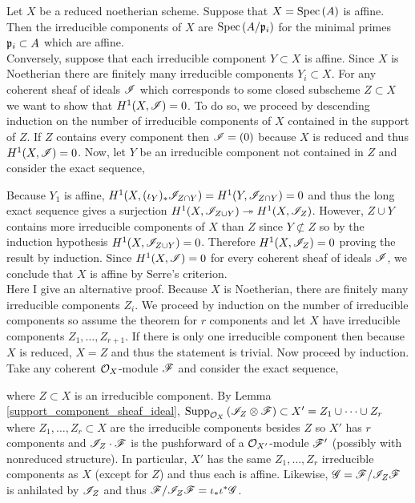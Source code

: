 \documentclass[12pt]{article}
\begin{document}
Let $X$ be a reduced noetherian scheme. Suppose that $X = \mathrm{Spec}\left( A \right)$ is affine. Then the irreducible components of $X$ are $\mathrm{Spec}\left( A/\mathfrak{p}_i \right)$ for the minimal primes $\mathfrak{p}_i \subset A$ which are affine. 
\bigskip\\
Conversely, suppose that each irreducible component $Y \subset X$ is affine. Since $X$ is Noetherian there are finitely many irreducible components $Y_i \subset X$. For any coherent sheaf of ideals $\mathscr{I}$ which corresponds to some closed subscheme $Z \subset X$ we want to show that $H^1(X, \mathscr{I}) = 0$. To do so, we proceed by descending induction on the number of irreducible components of $X$ contained in the support of $Z$. If $Z$ contains every component then $\mathscr{I} = (0)$ because $X$ is reduced and thus $H^1(X, \mathscr{I}) = 0$. Now, let $Y$ be an irreducible component not contained in $Z$ and consider the exact sequence,
\begin{center}
\end{center}
Because $Y_1$ is affine, $H^1(X, (\iota_{Y})_* \mathscr{I}_{Z \cap Y}) = H^1(Y, \mathscr{I}_{Z \cap Y}) = 0$ and thus the long exact sequence gives a surjection $H^1(X, \mathscr{I}_{Z \cup Y}) \twoheadrightarrow H^1(X, \mathscr{I}_Z)$. However, $Z \cup Y$ contains more irreducible components of $X$ than $Z$ since $Y \not\subset Z$ so by the induction hypothesis $H^1(X, \mathscr{I}_{Z \cup Y}) = 0$. Therefore $H^1(X, \mathscr{I}_Z) = 0$ proving the result by induction. Since $H^1(X, \mathscr{I}) = 0$ for every coherent sheaf of ideals $\mathscr{I}$, we conclude that $X$ is affine by Serre's criterion. 
\bigskip\\
Here I give an alternative proof. Because $X$ is Noetherian, there are finitely many irreducible components $Z_i$. We proceed by induction on the number of irreducible components so assume the theorem for $r$ components and let $X$ have irreducible components $Z_1, \dots, Z_{r+1}$. 
If there is only one irreducible component then because $X$ is reduced, $X = Z$ and thus the statement is trivial. Now proceed by induction. Take any coherent $\mathcal{O}_{X}$-module $\mathscr{F}$ and consider the exact sequence,
\begin{center}
\end{center}
where $Z \subset X$ is an irreducible component. By Lemma \ref{support_component_sheaf_ideal}, $\mathrm{Supp}_{\mathcal{O}_{X}}\left(\mathscr{I}_Z \otimes \mathscr{F} \right) \subset X' = Z_1 \cup \cdots \cup Z_r$ where $Z_1, \dots, Z_r \subset X$ are the irreducible components besides $Z$ so $X'$ has $r$ components and $\mathscr{I}_{Z} \cdot \mathscr{F}$ is the pushforward of a $\mathcal{O}_{X'}$-module $\mathscr{F}'$ (possibly with nonreduced structure). In particular, $X'$ has the same $Z_1, \dots, Z_r$ irreducible components as $X$ (except for $Z$) and thus each is affine. Likewise, $\mathscr{G} = \mathscr{F} / \mathscr{I}_Z \mathscr{F}$ is anhilated by $\mathscr{I}_Z$ and thus $\mathscr{F} / \mathscr{I}_Z \mathscr{F} = \iota_* \iota^* \mathscr{G}$. 
\end{document}
